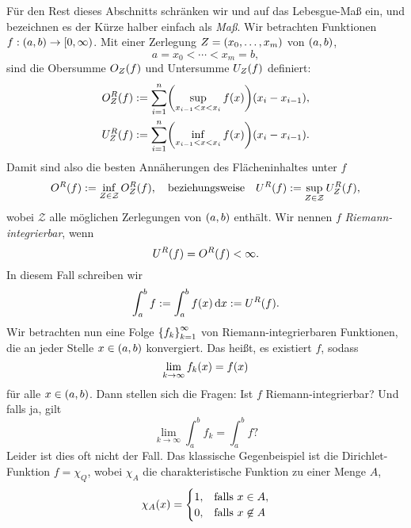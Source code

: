 Für den Rest dieses Abschnitts schränken wir und auf das Lebesgue-Maß ein, und bezeichnen es der Kürze halber einfach als \emph{Maß}.
Wir betrachten Funktionen \(f: \parentheses*{a, b} \to \left[0, \infty\right)\).
Mit einer Zerlegung \(Z = \parentheses*{x_0, \ldots, x_m}\) von \(\parentheses*{a, b}\),
\[
	a = x_0 < \cdots < x_m = b,
\]
sind die Obersumme \(O_Z\parentheses*{f}\) und Untersumme \(U_Z\parentheses*{f}\) definiert:
\begin{align}
	O_Z^R\parentheses*{f} &:= \sum_{i = 1}^n \parentheses*{\sup_{x_{i - 1} < x < x_i}f\parentheses*{x}}\parentheses*{x_i - x_{i - 1}},\label{eq:1-1}\\
	U_Z^R\parentheses*{f} &:= \sum_{i = 1}^n \parentheses*{\inf_{x_{i - 1} < x < x_i}f\parentheses*{x}}\parentheses*{x_i - x_{i - 1}}.\label{eq:1-2}
\end{align}
Damit sind also die besten Annäherungen des Flächeninhaltes unter \(f\)
\begin{equation}\label{eq:1-3}
	O^R\parentheses*{f} := \inf_{Z \in \mathcal{Z}}O_Z^R\parentheses*{f}, \quad \text{beziehungsweise} \quad U^R\parentheses*{f} := \sup_{Z \in \mathcal{Z}}U_Z^R\parentheses*{f},
\end{equation}
wobei \(\mathcal{Z}\) alle möglichen Zerlegungen von \(\parentheses*{a, b}\) enthält.
Wir nennen \(f\) \emph{Riemann-integrierbar}, wenn
\begin{equation}
	U^R\parentheses*{f} = O^R\parentheses*{f} < \infty.
\end{equation}
In diesem Fall schreiben wir
\[
	\int_a^b f := \int_a^b f\parentheses*{x}\d x := U^R\parentheses*{f}.
\]
Wir betrachten nun eine Folge \(\braces*{f_k}_{k = 1}^\infty\) von Riemann-integrierbaren Funktionen, die an jeder Stelle \(x \in \parentheses*{a, b}\) konvergiert.
Das heißt, es existiert \(f\), sodass
\[
	\lim_{k \to \infty}f_k\parentheses*{x} = f\parentheses*{x}
\]
für alle \(x \in \parentheses*{a, b}\).
Dann stellen sich die Fragen:
Ist \(f\) Riemann-integrierbar?
Und falls ja, gilt
\begin{equation}
	\lim_{k \to \infty}\int_a^b f_k = \int_a^b f\text{?}
\end{equation}
Leider ist dies oft nicht der Fall.
Das klassische Gegenbeispiel ist die Dirichlet-Funktion \(f = \chi_Q\), wobei \(\chi_A\) die charakteristische Funktion zu einer Menge \(A\),
\begin{equation}\label{eq:1-6}
	\chi_A\parentheses*{x} = \begin{cases}
		1, & \text{falls }x \in A,\\
		0, & \text{falls }x \not\in A
	\end{cases}
\end{equation}
